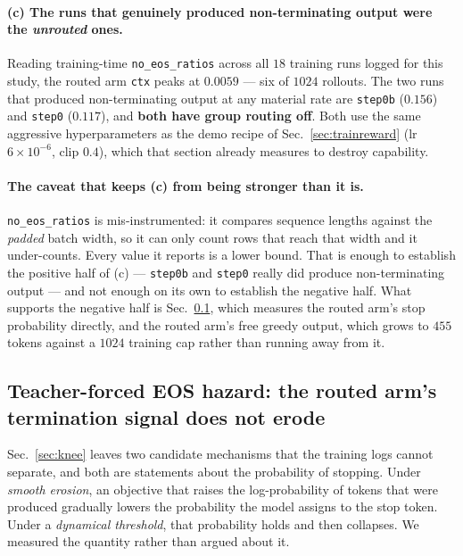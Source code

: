 \paragraph{(c) The runs that genuinely produced non-terminating output were the
\emph{unrouted} ones.} Reading training-time \texttt{no\_eos\_ratios} across all $18$ training
runs logged for this study, the routed arm \texttt{ctx} peaks at $0.0059$ --- six of $1024$
rollouts. The two runs that produced non-terminating output at any material rate are
\texttt{step0b} ($0.156$) and \texttt{step0} ($0.117$), and \textbf{both have group routing
off}. Both use the same aggressive hyperparameters as the demo recipe of
Sec.~\ref{sec:trainreward} (lr $6\times10^{-6}$, clip $0.4$), which that section already
measures to destroy capability.

\paragraph{The caveat that keeps (c) from being stronger than it is.}
\texttt{no\_eos\_ratios} is mis-instrumented: it compares sequence lengths against the
\emph{padded} batch width, so it can only count rows that reach that width and it
under-counts. Every value it reports is a lower bound. That is enough to establish the
positive half of (c) --- \texttt{step0b} and \texttt{step0} really did produce non-terminating
output --- and not enough on its own to establish the negative half. What supports the
negative half is Sec.~\ref{sec:eos}, which measures the routed arm's stop probability
directly, and the routed arm's free greedy output, which grows to $455$ tokens against a
$1024$ training cap rather than running away from it.

\subsection{Teacher-forced EOS hazard: the routed arm's termination signal does not erode}
\label{sec:eos}

Sec.~\ref{sec:knee} leaves two candidate mechanisms that the training logs cannot separate,
and both are statements about the probability of stopping. Under \emph{smooth erosion}, an
objective that raises the log-probability of tokens that were produced gradually lowers the
probability the model assigns to the stop token. Under a \emph{dynamical threshold}, that
probability holds and then collapses. We measured the quantity rather than argued about it.


